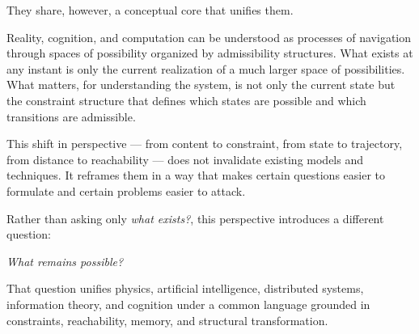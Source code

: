 \documentclass[11pt, a4paper]{article}
\theoremstyle{named}
\begin{document}
They share, however, a conceptual core that unifies them.

Reality, cognition, and computation can be understood as processes
of navigation through spaces of possibility organized by admissibility
structures. What exists at any instant is only the current realization
of a much larger space of possibilities. What matters, for
understanding the system, is not only the current state but the
constraint structure that defines which states are possible and which
transitions are admissible.

This shift in perspective --- from content to constraint, from state
to trajectory, from distance to reachability --- does not invalidate
existing models and techniques. It reframes them in a way that makes
certain questions easier to formulate and certain problems easier to
attack.

Rather than asking only \emph{what exists?}, this perspective
introduces a different question:

\begin{center}
\textit{What remains possible?}
\end{center}

That question unifies physics, artificial intelligence, distributed
systems, information theory, and cognition under a common language
grounded in constraints, reachability, memory, and structural
transformation.
\end{document}
